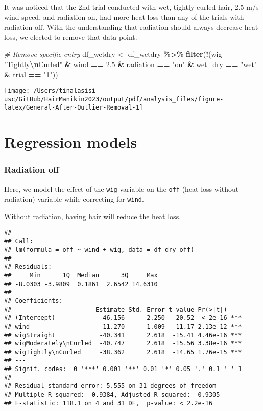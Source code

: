\documentclass[
]{article}
\newenvironment{Shaded}{\begin{snugshade}}{\end{snugshade}}
\newcommand{\CommentTok}[1]{\textcolor[rgb]{0.56,0.35,0.01}{\textit{#1}}}
\newcommand{\FloatTok}[1]{\textcolor[rgb]{0.00,0.00,0.81}{#1}}
\newcommand{\FunctionTok}[1]{\textcolor[rgb]{0.13,0.29,0.53}{\textbf{#1}}}
\newcommand{\NormalTok}[1]{#1}
\newcommand{\OtherTok}[1]{\textcolor[rgb]{0.56,0.35,0.01}{#1}}
\newcommand{\SpecialCharTok}[1]{\textcolor[rgb]{0.81,0.36,0.00}{\textbf{#1}}}
\newcommand{\StringTok}[1]{\textcolor[rgb]{0.31,0.60,0.02}{#1}}
\begin{document}
It was noticed that the 2nd trial conducted with wet, tightly curled
hair, 2.5 m/s wind speed, and radiation on, had more heat loss than any
of the trials with radiation off. With the understanding that radiation
should always decrease heat loss, we elected to remove that data point.

\begin{Shaded}
\begin{Highlighting}[]
\CommentTok{\# Remove specific entry}
\NormalTok{df\_wetdry }\OtherTok{\textless{}{-}}\NormalTok{ df\_wetdry }\SpecialCharTok{\%\textgreater{}\%}
    \FunctionTok{filter}\NormalTok{(}\SpecialCharTok{!}\NormalTok{(wig }\SpecialCharTok{==} \StringTok{"Tightly}\SpecialCharTok{\textbackslash{}n}\StringTok{Curled"} \SpecialCharTok{\&}\NormalTok{ wind }\SpecialCharTok{==} \FloatTok{2.5} \SpecialCharTok{\&}\NormalTok{ radiation }\SpecialCharTok{==}
        \StringTok{"on"} \SpecialCharTok{\&}\NormalTok{ wet\_dry }\SpecialCharTok{==} \StringTok{"wet"} \SpecialCharTok{\&}\NormalTok{ trial }\SpecialCharTok{==} \StringTok{"1"}\NormalTok{))}
\end{Highlighting}
\end{Shaded}

\texttt{[image: /Users/tinalasisi-usc/GitHub/HairManikin2023/output/pdf/analysis\_files/figure-latex/General-After-Outlier-Removal-1]}

\hypertarget{regression-models}{%
\section{Regression models}\label{regression-models}}

\hypertarget{radiation-off}{%
\subsubsection{Radiation off}\label{radiation-off}}

Here, we model the effect of the \texttt{wig} variable on the
\texttt{off} (heat loss without radiation) variable while correcting for
\texttt{wind}.

Without radiation, having hair will reduce the heat loss.

\begin{verbatim}
## 
## Call:
## lm(formula = off ~ wind + wig, data = df_dry_off)
## 
## Residuals:
##     Min      1Q  Median      3Q     Max 
## -8.0303 -3.9809  0.1861  2.6542 14.6310 
## 
## Coefficients:
##                       Estimate Std. Error t value Pr(>|t|)    
## (Intercept)             46.156      2.250   20.52  < 2e-16 ***
## wind                    11.270      1.009   11.17 2.13e-12 ***
## wigStraight            -40.341      2.618  -15.41 4.46e-16 ***
## wigModerately\nCurled  -40.747      2.618  -15.56 3.38e-16 ***
## wigTightly\nCurled     -38.362      2.618  -14.65 1.76e-15 ***
## ---
## Signif. codes:  0 '***' 0.001 '**' 0.01 '*' 0.05 '.' 0.1 ' ' 1
## 
## Residual standard error: 5.555 on 31 degrees of freedom
## Multiple R-squared:  0.9384, Adjusted R-squared:  0.9305 
## F-statistic: 118.1 on 4 and 31 DF,  p-value: < 2.2e-16
\end{verbatim}
\end{document}
